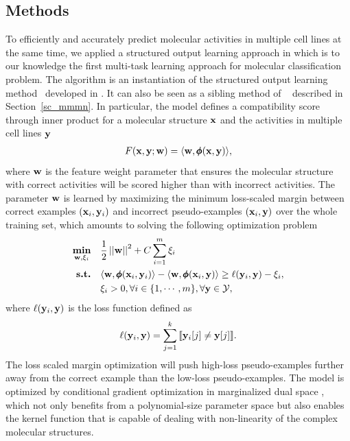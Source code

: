 {%
%
\subsection{Methods}

To efficiently and accurately predict molecular activities in multiple cell lines at the same time, we applied a structured output learning approach in  which is to our knowledge the first multi-task learning approach for molecular classification problem.
The algorithm is an instantiation of the structured output learning method \mmcrf\ developed in \citep{Rousu07}.
It can also be seen as a sibling method of \mmmn\ \citep{Taskar04max} described in Section~\ref{sc_mmmn}.
In particular, the model defines a compatibility score through inner product for a molecular structure $\mathbf {x}$ and the activities in multiple cell lines $\mathbf {y}$
\begin{align*}
	F(\mathbf {x},\mathbf {y};\mathbf {w}) = \langle \mathbf {w}, \pmb \phi(\mathbf {x},\mathbf {y}) \rangle,
\end{align*}
where $\mathbf {w}$ is the feature weight parameter that ensures the molecular structure with correct activities will be scored higher than with incorrect activities.
The parameter $\mathbf {w}$ is learned by maximizing the minimum loss-scaled margin between correct examples $(\mathbf {x}_i,\mathbf {y}_i)$ and incorrect pseudo-examples $(\mathbf {x}_i,\mathbf {y})$ over the whole training set, which amounts to solving the following optimization problem
\begin{align*}
	\underset{\mathbf {w},\mathbf{\xi}_i}{\textbf{min}} & \quad \frac{1}{2}\left|\left| \mathbf {w} \right|\right|^2 + C\sum_{i=1}^{m}\xi_i\\
	\textbf{s.t.} &\quad \langle \mathbf {w}, \pmb \phi(\mathbf {x}_i,\mathbf {y}_i) \rangle - \langle \mathbf {w}, \pmb \phi(\mathbf {x}_i,\mathbf {y}) \rangle \ge \ell(\mathbf {y}_i,\mathbf {y})-\xi_i,\\
	&\quad \xi_i>0, \forall i\in\{1,\cdots,m\}, \forall \mathbf {y}\in\mathcal{Y},
\end{align*}
where $\ell(\mathbf {y}_i,\mathbf {y})$ is the loss function defined as
\begin{align*}
	\ell(\mathbf {y}_i,\mathbf {y}) = \sum_{j=1}^{k}{\llbracket \mathbf {y}_i[j]\neq \mathbf {y}[j] \rrbracket}.
\end{align*}
The loss scaled margin optimization will push high-loss pseudo-examples further away from the correct example than the low-loss pseudo-examples.
The model is optimized by conditional gradient optimization \citep{Bertsekas95nonlinear} in marginalized dual space \citep{Taskar04max}, which not only benefits from a polynomial-size parameter space but also enables the kernel function that is capable of dealing with non-linearity of the complex molecular structures.

}
